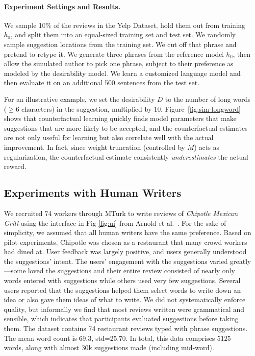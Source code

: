 \documentclass[11pt,letterpaper]{article}
\begin{document}
\paragraph{Experiment Settings and Results.}
We sample 10\% of the reviews in the Yelp Dataset, hold them out from training $h_0$, and split them into an equal-sized training set and test set. We randomly sample suggestion locations from the training set. We cut off that phrase and pretend to retype it. We generate three phrases from the reference model $h_0$, then allow the simulated author to pick one phrase, subject to their preference as modeled by the desirability model. We learn a customized language model and then evaluate it on an additional 500 sentences from the test set.

For an illustrative example, we set the desirability $D$ to the number of long words ($\ge 6$ characters) in the suggestion, multiplied by 10. Figure~\ref{fig:sim-longword} shows that counterfactual learning quickly finds model parameters that make suggestions that are more likely to be accepted, and the counterfactual estimates are not only useful for learning but also correlate well with the actual improvement.  In fact, since weight truncation (controlled by $M$) acts as regularization, the counterfactual estimate consistently \emph{underestimates} the actual reward.


\subsection{Experiments with Human Writers}
%
We recruited 74 workers through MTurk to write reviews of \emph{Chipotle Mexican Grill} using the interface in Fig \ref{fig:ui} from Arnold et al.~.
For the sake of simplicity, we assumed that all human writers have the same preference.
Based on pilot experiments, Chipotle was chosen as a restaurant that many crowd workers had dined at.
User feedback was largely positive, and users generally understood the suggestions' intent. The users' engagement with the suggestions varied greatly---some loved the suggestions and their entire review consisted of nearly only words entered with suggestions while others used very few suggestions. Several users reported that the suggestions helped them select words to write down an idea or also gave them ideas of what to write. We did not systematically enforce quality, but informally we find that most reviews written were grammatical and sensible, which indicates that participants evaluated suggestions before taking them.
%
The dataset contains 74 restaurant reviews typed with phrase suggestions. The mean word count is 69.3,  std=25.70. In total, this data comprises 5125 words, along with almost 30k suggestions made (including mid-word).
\end{document}
